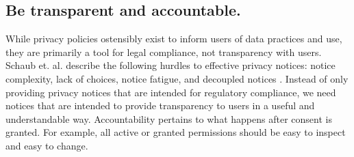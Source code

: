 \subsection{Be transparent and accountable.}
While privacy policies ostensibly exist to inform users of data practices and use, they are primarily a tool for legal compliance, not transparency with users. Schaub et. al. describe the following hurdles to effective privacy notices: notice complexity, lack of choices, notice fatigue, and decoupled notices \cite{schaub}. Instead of only providing privacy notices that are intended for regulatory compliance, we need notices that are intended to provide transparency to users in a useful and understandable way. Accountability pertains to what happens after consent is granted. For example, all active or granted permissions should be easy to inspect and easy to change.
